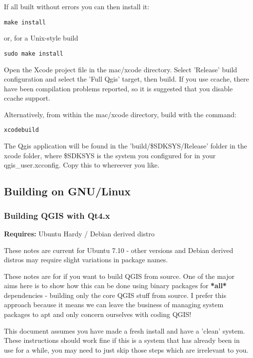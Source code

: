 If all built without errors you can then install it:

\begin{verbatim}
make install 
\end{verbatim}

or, for a Unix-style build

\begin{verbatim}
sudo make install
\end{verbatim}

Open the Xcode project file in the mac/xcode directory. Select 'Release' build
configuration and select the 'Full Qgis' target, then build. If you use ccache,
there have been compilation problems reported, so it is suggested that you disable
ccache support.

Alternatively, from within the mac/xcode directory, build with the command:

\begin{verbatim}
xcodebuild
\end{verbatim}

The Qgis application will be found in the 'build/\$SDKSYS/Release' folder
in the xcode folder, where \$SDKSYS is the system you configured for in your
qgis\_user.xcconfig. Copy this to whereever you like.


\subsection{Building on GNU/Linux}
\subsubsection{Building QGIS with Qt4.x}
\textbf{Requires:} Ubuntu Hardy / Debian derived distro

These notes are current for Ubuntu 7.10 - other versions and Debian derived 
distros may require slight variations in package names.

These notes are for if you want to build QGIS from source. One of the major
aims here is to show how this can be done using binary packages for \textbf{*all*}
dependencies - building only the core QGIS stuff from source. I prefer this
approach because it means we can leave the business of managing system packages
to apt and only concern ourselves with coding QGIS! 

This document assumes you have made a fresh install and have a 'clean' system.
These instructions should work fine if this is a system that has already been
in use for a while, you may need to just skip those steps which are irrelevant
to you.

